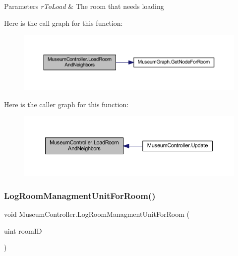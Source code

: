\begin{DoxyParams}{Parameters}
{\em r\+To\+Load} & The room that needs loading\\
\hline
\end{DoxyParams}
Here is the call graph for this function\+:
\nopagebreak
\begin{figure}[H]
\begin{center}
\leavevmode
\includegraphics[width=350pt]{class_museum_controller_a8f4312e1b672427e94e590e499d2ca8d_cgraph}
\end{center}
\end{figure}
Here is the caller graph for this function\+:
\nopagebreak
\begin{figure}[H]
\begin{center}
\leavevmode
\includegraphics[width=350pt]{class_museum_controller_a8f4312e1b672427e94e590e499d2ca8d_icgraph}
\end{center}
\end{figure}
\mbox{\label{class_museum_controller_a56fa5cc287bbe98e48284641da456f61}} 
\subsubsection{\texorpdfstring{Log\+Room\+Managment\+Unit\+For\+Room()}{LogRoomManagmentUnitForRoom()}}
{\footnotesize\ttfamily void Museum\+Controller.\+Log\+Room\+Managment\+Unit\+For\+Room (\begin{DoxyParamCaption}\item[{uint}]{room\+ID }\end{DoxyParamCaption})}



